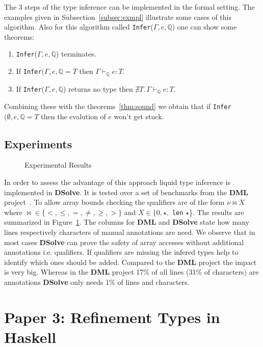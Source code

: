 \documentclass[a4paper,UKenglish]{lipics-v2016}
\begin{document}
The 3 steps of the type inference can be implemented in the formal setting.
The examples given in Subsection~\ref{subsec:exmpl} illustrate some cases of this algorithm.
Also for this algorithm called \lstinline{Infer}($\Gamma, e, \mathbb{Q}$) one can show some theorems:
\begin{enumerate}
    \item \lstinline{Infer}($\Gamma, e, \mathbb{Q}$) terminates.
    \item If \lstinline{Infer}$(\Gamma, e, \mathbb{Q} = T$ then $\Gamma \vdash_{\mathbb{Q}} e: T$.
    \item If \lstinline{Infer}($\Gamma, e, \mathbb{Q}$) returns no type then $\nexists T.\, \Gamma \vdash_{\mathbb{Q}} e: T$.
\end{enumerate}

Combining these with the theorems~\ref{thm:sound} we obtain that if \lstinline{Infer}$(\emptyset, e, \mathbb{Q} = T$ then the evalution of $e$ won't get stuck.

\subsection{Experiments}

\begin{figure}
    \caption{Experimental Results}
    \label{fig:exp}
\end{figure}

In order to assess the advantage of this approach liquid type inference is implemented in \textbf{DSolve}.
It is tested over a set of benchmarks from the \textbf{DML} project~\cite{Xi:1998:EAB}.
To allow array bounds checking the qualifiers are of the form $\nu \bowtie X$ where $\bowtie \in \{<, \le, =, \neq, \geq, >\}$ and $X \in \{0, \star,$ \lstinline{len} $\star$\}.
The results are summarized in Figure~\ref{fig:exp}.
The columns for \textbf{DML} and \textbf{DSolve} state how many lines respectively characters of manual annotations are need.
We observe that in most cases \textbf{DSolve} can prove the safety of array accesses without additional annotations i.e. qualifiers.
If qualifiers are missing the infered types help to identify which ones should be added.
Compared to the \textbf{DML} project the impact is very big.
Whereas in the \textbf{DML} project 17\% of all lines (31\% of characters) are annotations \textbf{DSolve} only needs 1\% of lines and characters.



\section{Paper 3: Refinement Types in Haskell}
\end{document}
